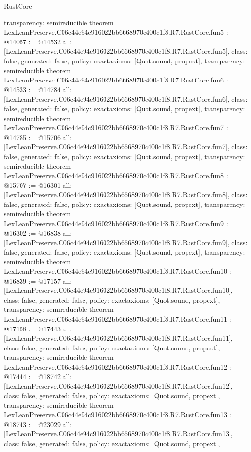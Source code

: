 \begin{lexlean}{RustCore}
\begin{coremodule}
{  transparency: semireducible
}
theorem LexLeanPreserve.C06c44e94c916022bb6668970c400c1f8.R7.RustCore.fun5 : @14057 := @14532 {
  all: [LexLeanPreserve.C06c44e94c916022bb6668970c400c1f8.R7.RustCore.fun5],
  class: false,
  generated: false,
  policy: exact{axioms: [Quot.sound, propext]},
  transparency: semireducible
}
theorem LexLeanPreserve.C06c44e94c916022bb6668970c400c1f8.R7.RustCore.fun6 : @14533 := @14784 {
  all: [LexLeanPreserve.C06c44e94c916022bb6668970c400c1f8.R7.RustCore.fun6],
  class: false,
  generated: false,
  policy: exact{axioms: [Quot.sound, propext]},
  transparency: semireducible
}
theorem LexLeanPreserve.C06c44e94c916022bb6668970c400c1f8.R7.RustCore.fun7 : @14785 := @15706 {
  all: [LexLeanPreserve.C06c44e94c916022bb6668970c400c1f8.R7.RustCore.fun7],
  class: false,
  generated: false,
  policy: exact{axioms: [Quot.sound, propext]},
  transparency: semireducible
}
theorem LexLeanPreserve.C06c44e94c916022bb6668970c400c1f8.R7.RustCore.fun8 : @15707 := @16301 {
  all: [LexLeanPreserve.C06c44e94c916022bb6668970c400c1f8.R7.RustCore.fun8],
  class: false,
  generated: false,
  policy: exact{axioms: [Quot.sound, propext]},
  transparency: semireducible
}
theorem LexLeanPreserve.C06c44e94c916022bb6668970c400c1f8.R7.RustCore.fun9 : @16302 := @16838 {
  all: [LexLeanPreserve.C06c44e94c916022bb6668970c400c1f8.R7.RustCore.fun9],
  class: false,
  generated: false,
  policy: exact{axioms: [Quot.sound, propext]},
  transparency: semireducible
}
theorem LexLeanPreserve.C06c44e94c916022bb6668970c400c1f8.R7.RustCore.fun10 : @16839 := @17157 {
  all: [LexLeanPreserve.C06c44e94c916022bb6668970c400c1f8.R7.RustCore.fun10],
  class: false,
  generated: false,
  policy: exact{axioms: [Quot.sound, propext]},
  transparency: semireducible
}
theorem LexLeanPreserve.C06c44e94c916022bb6668970c400c1f8.R7.RustCore.fun11 : @17158 := @17443 {
  all: [LexLeanPreserve.C06c44e94c916022bb6668970c400c1f8.R7.RustCore.fun11],
  class: false,
  generated: false,
  policy: exact{axioms: [Quot.sound, propext]},
  transparency: semireducible
}
theorem LexLeanPreserve.C06c44e94c916022bb6668970c400c1f8.R7.RustCore.fun12 : @17444 := @18742 {
  all: [LexLeanPreserve.C06c44e94c916022bb6668970c400c1f8.R7.RustCore.fun12],
  class: false,
  generated: false,
  policy: exact{axioms: [Quot.sound, propext]},
  transparency: semireducible
}
theorem LexLeanPreserve.C06c44e94c916022bb6668970c400c1f8.R7.RustCore.fun13 : @18743 := @23029 {
  all: [LexLeanPreserve.C06c44e94c916022bb6668970c400c1f8.R7.RustCore.fun13],
  class: false,
  generated: false,
  policy: exact{axioms: [Quot.sound, propext]},
}
\end{coremodule}
\end{lexlean}

